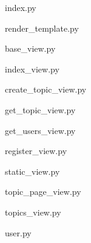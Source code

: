 
index.py


render\_template.py


base\_view.py


index\_view.py


create\_topic\_view.py


get\_topic\_view.py


get\_users\_view.py


register\_view.py


static\_view.py


topic\_page\_view.py


topics\_view.py


user.py



